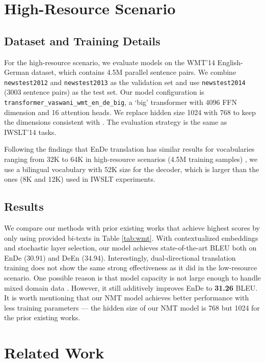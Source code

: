 \documentclass[11pt]{article}
\begin{document}
\section{High-Resource Scenario}
\label{sec:wmt}


\subsection{Dataset and Training Details}
For the high-resource scenario, we evaluate models on the WMT'14 English-German dataset, which contains 4.5M parallel sentence pairs. We combine \texttt{newstest2012} and \texttt{newstest2013} as the validation set and use \texttt{newstest2014} (3003 sentence pairs) as the test set. Our model configuration is \texttt{transformer\_vaswani\_wmt\_en\_de\_big}, a `big' transformer with 4096 FFN dimension and 16 attention heads. We replace hidden size 1024 with 768 to keep the dimensions consistent with . The evaluation strategy is the same as IWSLT'14 tasks.

Following the findings that EnDe translation has similar results for vocabularies ranging from 32K to 64K in high-resource scenarios (4.5M training samples) \citep{gowda-may-2020-finding}, we use a bilingual vocabulary with 52K size for the decoder, which is larger than the ones (8K and 12K) used in IWSLT experiments.


\subsection{Results}
We compare our methods with prior existing works that achieve highest scores by only using provided bi-texts in Table \ref{tab:wmt}. With  contextualized embeddings and stochastic layer selection, our model achieves state-of-the-art BLEU both on EnDe (30.91) and DeEn (34.94). Interestingly, dual-directional translation training does not show the same strong effectiveness as it did in the low-resource scenario. One possible reason is that model capacity is not large enough to handle mixed domain data \citep{arivazhagan2019massively}. However, it still additively improves EnDe to \textbf{31.26} BLEU. It is worth mentioning that our NMT model achieves better performance with less training parameters --- the hidden size of our NMT model is 768 but 1024 for the prior existing works.





\section{Related Work}
\end{document}
